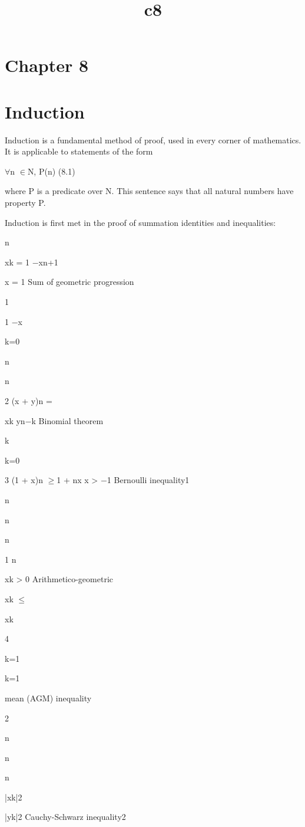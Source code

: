 \documentclass[11pt]{article}
\title{c8}
\date{}
\theoremstyle{plain}
\theoremstyle{definition}
\begin{document}
\maketitle

\section{Chapter 8}

\section{Induction}

Induction is a fundamental method of proof, used in every corner of mathematics. It is applicable to statements of the form

$\forall$n $\in$N, P(n) (8.1)

where P is a predicate over N. This sentence says that all natural numbers have property P.

Induction is first met in the proof of summation identities and inequalities:

n

xk = 1 $-$xn+1

x = 1 Sum of geometric progression

1

1 $-$x

k=0

n

n

2 (x + y)n =

xk yn$-$k Binomial theorem

k

k=0

3 (1 + x)n $\geq$1 + nx x > $-$1 Bernoulli inequality1

n

n

n

1 n

xk > 0 Arithmetico-geometric

xk $\leq$

xk

4

k=1

k=1

mean (AGM) inequality

2

n

n

n

|xk|2

|yk|2 Cauchy-Schwarz inequality2
\end{document}
